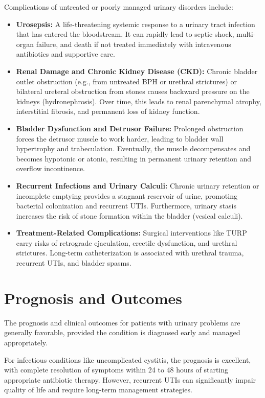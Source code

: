 Complications of untreated or poorly managed urinary disorders include:
\begin{itemize}
    \item \textbf{Urosepsis:} A life-threatening systemic response to a urinary tract infection that has entered the bloodstream. It can rapidly lead to septic shock, multi-organ failure, and death if not treated immediately with intravenous antibiotics and supportive care.
    \item \textbf{Renal Damage and Chronic Kidney Disease (CKD):} Chronic bladder outlet obstruction (e.g., from untreated BPH or urethral strictures) or bilateral ureteral obstruction from stones causes backward pressure on the kidneys (hydronephrosis). Over time, this leads to renal parenchymal atrophy, interstitial fibrosis, and permanent loss of kidney function.
    \item \textbf{Bladder Dysfunction and Detrusor Failure:} Prolonged obstruction forces the detrusor muscle to work harder, leading to bladder wall hypertrophy and trabeculation. Eventually, the muscle decompensates and becomes hypotonic or atonic, resulting in permanent urinary retention and overflow incontinence.
    \item \textbf{Recurrent Infections and Urinary Calculi:} Chronic urinary retention or incomplete emptying provides a stagnant reservoir of urine, promoting bacterial colonization and recurrent UTIs. Furthermore, urinary stasis increases the risk of stone formation within the bladder (vesical calculi).
    \item \textbf{Treatment-Related Complications:} Surgical interventions like TURP carry risks of retrograde ejaculation, erectile dysfunction, and urethral strictures. Long-term catheterization is associated with urethral trauma, recurrent UTIs, and bladder spasms.
\end{itemize}

\section*{Prognosis and Outcomes}
The prognosis and clinical outcomes for patients with urinary problems are generally favorable, provided the condition is diagnosed early and managed appropriately.

For infectious conditions like uncomplicated cystitis, the prognosis is excellent, with complete resolution of symptoms within 24 to 48 hours of starting appropriate antibiotic therapy. However, recurrent UTIs can significantly impair quality of life and require long-term management strategies.

